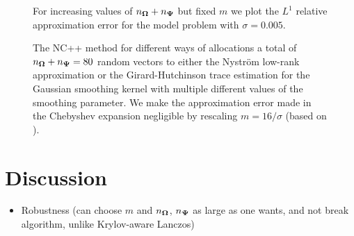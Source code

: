 \documentclass[12pt]{article}
\begin{document}
\begin{figure}[ht]
    \centering
    
    \caption{For increasing values of $n_{\boldsymbol{\Omega}} + n_{\boldsymbol{\Psi}}$ but fixed $m$ we plot the $L^1$ relative approximation error for the model problem with $\sigma=0.005$.}
    \label{fig:convergence}
\end{figure}


\begin{figure}[ht]
    \centering
    
    \caption{The NC++ method for different ways of allocations a 
    total of $n_{\boldsymbol{\Omega}} + n_{\boldsymbol{\Psi}}=80$ random vectors to either the Nystr\"om low-rank approximation or the Girard-Hutchinson trace estimation for the Gaussian smoothing kernel with multiple different values of the smoothing parameter. We make the approximation error made in the Chebyshev expansion negligible by rescaling $m=16 / \sigma$ (based on ).}
    \label{fig:matvec-mix}
\end{figure}


\section{Discussion}
\label{sec:discussion}

\begin{itemize}
    \item Robustness (can choose $m$ and $n_{\boldsymbol{\Omega}}$, $n_{\boldsymbol{\Psi}}$ as large as one wants, and not break algorithm, unlike Krylov-aware Lanczos)
\end{itemize}


\clearpage



\end{document}
